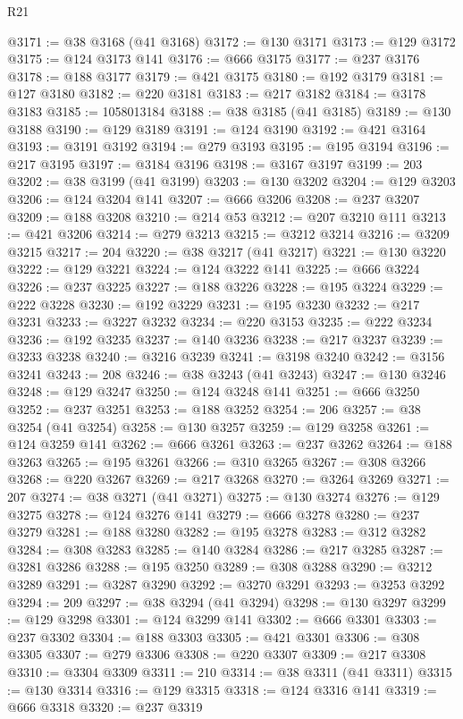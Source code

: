 \begin{lexlean}{R21}
\begin{coremodule}
@3171 := @38 @3168 (@41 @3168)
@3172 := @130 @3171
@3173 := @129 @3172
@3175 := @124 @3173 @141
@3176 := @666 @3175
@3177 := @237 @3176
@3178 := @188 @3177
@3179 := @421 @3175
@3180 := @192 @3179
@3181 := @127 @3180
@3182 := @220 @3181
@3183 := @217 @3182
@3184 := @3178 @3183
@3185 := 1058013184
@3188 := @38 @3185 (@41 @3185)
@3189 := @130 @3188
@3190 := @129 @3189
@3191 := @124 @3190
@3192 := @421 @3164
@3193 := @3191 @3192
@3194 := @279 @3193
@3195 := @195 @3194
@3196 := @217 @3195
@3197 := @3184 @3196
@3198 := @3167 @3197
@3199 := 203
@3202 := @38 @3199 (@41 @3199)
@3203 := @130 @3202
@3204 := @129 @3203
@3206 := @124 @3204 @141
@3207 := @666 @3206
@3208 := @237 @3207
@3209 := @188 @3208
@3210 := @214 @53
@3212 := @207 @3210 @111
@3213 := @421 @3206
@3214 := @279 @3213
@3215 := @3212 @3214
@3216 := @3209 @3215
@3217 := 204
@3220 := @38 @3217 (@41 @3217)
@3221 := @130 @3220
@3222 := @129 @3221
@3224 := @124 @3222 @141
@3225 := @666 @3224
@3226 := @237 @3225
@3227 := @188 @3226
@3228 := @195 @3224
@3229 := @222 @3228
@3230 := @192 @3229
@3231 := @195 @3230
@3232 := @217 @3231
@3233 := @3227 @3232
@3234 := @220 @3153
@3235 := @222 @3234
@3236 := @192 @3235
@3237 := @140 @3236
@3238 := @217 @3237
@3239 := @3233 @3238
@3240 := @3216 @3239
@3241 := @3198 @3240
@3242 := @3156 @3241
@3243 := 208
@3246 := @38 @3243 (@41 @3243)
@3247 := @130 @3246
@3248 := @129 @3247
@3250 := @124 @3248 @141
@3251 := @666 @3250
@3252 := @237 @3251
@3253 := @188 @3252
@3254 := 206
@3257 := @38 @3254 (@41 @3254)
@3258 := @130 @3257
@3259 := @129 @3258
@3261 := @124 @3259 @141
@3262 := @666 @3261
@3263 := @237 @3262
@3264 := @188 @3263
@3265 := @195 @3261
@3266 := @310 @3265
@3267 := @308 @3266
@3268 := @220 @3267
@3269 := @217 @3268
@3270 := @3264 @3269
@3271 := 207
@3274 := @38 @3271 (@41 @3271)
@3275 := @130 @3274
@3276 := @129 @3275
@3278 := @124 @3276 @141
@3279 := @666 @3278
@3280 := @237 @3279
@3281 := @188 @3280
@3282 := @195 @3278
@3283 := @312 @3282
@3284 := @308 @3283
@3285 := @140 @3284
@3286 := @217 @3285
@3287 := @3281 @3286
@3288 := @195 @3250
@3289 := @308 @3288
@3290 := @3212 @3289
@3291 := @3287 @3290
@3292 := @3270 @3291
@3293 := @3253 @3292
@3294 := 209
@3297 := @38 @3294 (@41 @3294)
@3298 := @130 @3297
@3299 := @129 @3298
@3301 := @124 @3299 @141
@3302 := @666 @3301
@3303 := @237 @3302
@3304 := @188 @3303
@3305 := @421 @3301
@3306 := @308 @3305
@3307 := @279 @3306
@3308 := @220 @3307
@3309 := @217 @3308
@3310 := @3304 @3309
@3311 := 210
@3314 := @38 @3311 (@41 @3311)
@3315 := @130 @3314
@3316 := @129 @3315
@3318 := @124 @3316 @141
@3319 := @666 @3318
@3320 := @237 @3319

\end{coremodule}
\end{lexlean}
